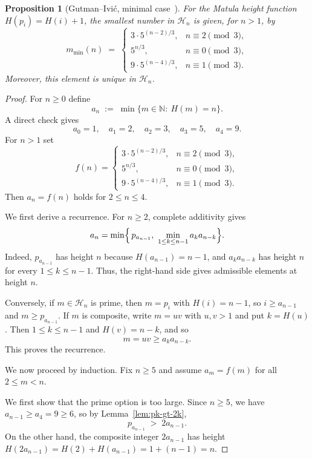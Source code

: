 \documentclass[11pt]{article}
\newtheorem{proposition}{Proposition}
\theoremstyle{definition}
\begin{document}
\begin{proposition}[Gutman--Ivi\'c, minimal case~\cite{gutman}]\label{prop:Matula-min}
For the Matula height function $H(p_i)=H(i)+1$, the smallest number in
$\mathcal H_n$ is given, for $n>1$, by
\[
  m_{\min}(n) \;=\;
  \begin{cases}
    3\cdot 5^{(n-2)/3}, & n \equiv 2 \pmod 3,\\[4pt]
    5^{n/3},            & n \equiv 0 \pmod 3,\\[4pt]
    9\cdot 5^{(n-4)/3}, & n \equiv 1 \pmod 3.
  \end{cases}
\]
Moreover, this element is unique in $\mathcal H_n$.
\end{proposition}

\begin{proof}
For $n\ge 0$ define
\[
  a_n \;:=\; \min\{m\in\mathbb N:\ H(m)=n\}.
\]
A direct check gives
\[
  a_0=1,\quad a_1=2,\quad a_2=3,\quad a_3=5,\quad a_4=9.
\]
For $n>1$ set
\[
f(n)=
\begin{cases}
3\cdot 5^{(n-2)/3}, & n\equiv 2\pmod 3,\\[4pt]
5^{n/3},            & n\equiv 0\pmod 3,\\[4pt]
9\cdot 5^{(n-4)/3}, & n\equiv 1\pmod 3.
\end{cases}
\]
Then $a_n=f(n)$ holds for $2\le n\le 4$.

We first derive a recurrence.  For $n\ge 2$, complete additivity gives
\begin{equation}\label{eq:recurrence}
a_n=\min\Bigl\{\,p_{a_{n-1}},\ \min_{1\le k\le n-1} a_k a_{n-k}\Bigr\}.
\end{equation}
Indeed, $p_{a_{n-1}}$ has height $n$ because $H(a_{n-1})=n-1$, and
$a_ka_{n-k}$ has height $n$ for every $1\le k\le n-1$.  Thus, the right-hand
side gives admissible elements at height $n$.

Conversely, if $m\in\mathcal H_n$ is prime, then $m=p_i$ with
$H(i)=n-1$, so $i\ge a_{n-1}$ and $m\ge p_{a_{n-1}}$.  If $m$ is composite,
write $m=uv$ with $u,v>1$ and put $k=H(u)$.  Then $1\le k\le n-1$ and
$H(v)=n-k$, and so
\[
  m=uv\ge a_ka_{n-k}.
\]
This proves the recurrence.

We now proceed by induction.  Fix $n\ge 5$ and assume $a_m=f(m)$ for all $2\le m<n$.

We first show that the prime option is too large.  Since $n\ge 5$, we have $a_{n-1}\ge a_4=9\ge 6$, so by Lemma~\ref{lem:pk-gt-2k},
\[
  p_{a_{n-1}} \;>\; 2a_{n-1}.
\]
On the other hand, the composite integer $2a_{n-1}$ has height
$H(2a_{n-1})=H(2)+H(a_{n-1})=1+(n-1)=n$.


\end{proof}
\end{document}
